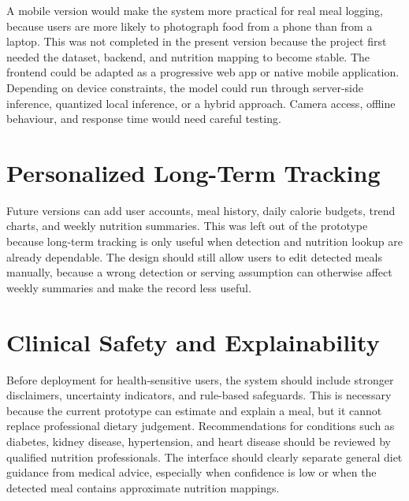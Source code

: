 A mobile version would make the system more practical for real meal logging, because users are more likely to photograph food from a phone than from a laptop. This was not completed in the present version because the project first needed the dataset, backend, and nutrition mapping to become stable. The frontend could be adapted as a progressive web app or native mobile application. Depending on device constraints, the model could run through server-side inference, quantized local inference, or a hybrid approach. Camera access, offline behaviour, and response time would need careful testing.

\section{Personalized Long-Term Tracking}

Future versions can add user accounts, meal history, daily calorie budgets, trend charts, and weekly nutrition summaries. This was left out of the prototype because long-term tracking is only useful when detection and nutrition lookup are already dependable. The design should still allow users to edit detected meals manually, because a wrong detection or serving assumption can otherwise affect weekly summaries and make the record less useful.

\section{Clinical Safety and Explainability}

Before deployment for health-sensitive users, the system should include stronger disclaimers, uncertainty indicators, and rule-based safeguards. This is necessary because the current prototype can estimate and explain a meal, but it cannot replace professional dietary judgement. Recommendations for conditions such as diabetes, kidney disease, hypertension, and heart disease should be reviewed by qualified nutrition professionals. The interface should clearly separate general diet guidance from medical advice, especially when confidence is low or when the detected meal contains approximate nutrition mappings.
